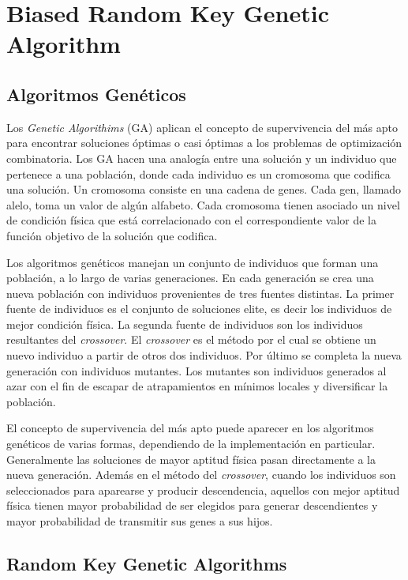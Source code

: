 
\chapter{Biased Random Key Genetic Algorithm}

\section{Algoritmos Genéticos}

Los \textit{Genetic Algorithims} (GA) \cite{Goldberg} aplican el concepto de supervivencia del más apto para encontrar soluciones óptimas o casi óptimas a los problemas de optimización combinatoria. Los GA hacen una analogía entre una solución y un individuo que pertenece a una población, donde cada individuo es un cromosoma que codifica una solución. Un cromosoma consiste en una cadena de genes. Cada gen, llamado alelo, toma un valor de algún alfabeto. Cada cromosoma tienen asociado un nivel de condición física que está correlacionado con el correspondiente valor de la función objetivo de la solución que codifica. 

\bigskip

Los algoritmos genéticos manejan un conjunto de individuos que forman una población, a lo largo de varias generaciones. En cada generación se crea una nueva población con individuos provenientes de tres fuentes distintas. La primer fuente de individuos es el conjunto de soluciones elite, es decir los individuos de mejor condición física. La segunda fuente de individuos son los individuos resultantes del \textit{crossover}. El \textit{crossover} es el método por el cual se obtiene un nuevo individuo a partir de otros dos individuos. Por último se completa la nueva generación con individuos mutantes. Los mutantes son individuos generados al azar con el fin de escapar de atrapamientos en mínimos locales y diversificar la población. 

\bigskip

El concepto de supervivencia del más apto puede aparecer en los algoritmos genéticos de varias formas, dependiendo de la implementación en particular. Generalmente las soluciones de mayor aptitud física pasan directamente a la nueva generación. Además en el método del \textit{crossover}, cuando los individuos son seleccionados para aparearse y producir descendencia, aquellos con mejor aptitud física tienen mayor probabilidad de ser elegidos para generar descendientes y mayor probabilidad de transmitir sus genes a sus hijos.

\section{Random Key Genetic Algorithms}

